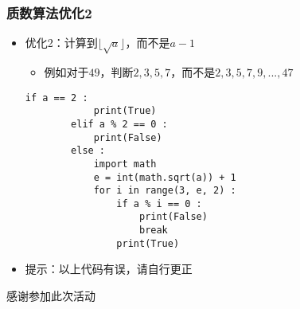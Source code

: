 \begin{frame} [fragile]
	\frametitle{质数算法优化2}
	\begin{itemize}
	\item 优化2：计算到$\lfloor\sqrt{a}\rfloor$，而不是$a - 1$
		\begin{itemize}
		\item 例如对于$49$，判断$2, 3, 5, 7$，而不是$2, 3, 5, 7, 9, ..., 47$
		\end{itemize}
		\begin{lstlisting}[style=pythonstyle, gobble=8]
		if a == 2 :
			print(True)
		elif a % 2 == 0 :
			print(False)
		else :
			import math
			e = int(math.sqrt(a)) + 1
			for i in range(3, e, 2) :
				if a % i == 0 :
					print(False)
					break
				print(True)
		\end{lstlisting}
	\item 提示：以上代码有误，请自行更正
	\end{itemize}
\end{frame}

\PreLastFrame
\begin{frame}
	\centerline{\fontsize{32}{32}\selectfont 感谢参加此次活动}
\end{frame}

\newpage


